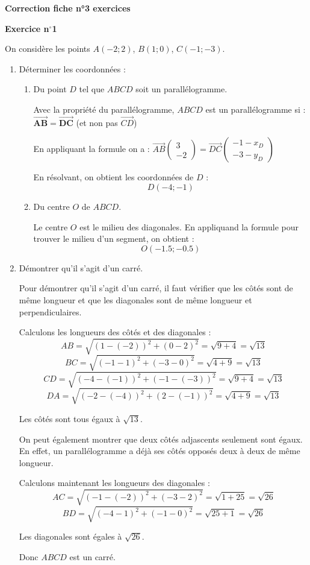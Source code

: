 \documentclass{article}
\newcommand*{\Coord}[2]{%
  \ensuremath{
    \begin{pmatrix}
      #1 \\[10pt]
      #2
    \end{pmatrix}}
}
\begin{document}
\begin{center}
    \Large{\textbf{Correction fiche n°3 exercices}}
\end{center}

\textbf{Exercice n$^\circ$1}

On considère les points $A(-2; 2)$, $B(1; 0)$, $C(-1; -3)$.

\begin{enumerate}
    \item Déterminer les coordonnées :

    \begin{enumerate}
        \item Du point $D$ tel que $ABCD$ soit un parallélogramme.

        Avec la propriété du parallélogramme, $ABCD$ est un parallélogramme si : 
        $\bm{\overrightarrow{AB} = \overrightarrow{DC}}$ (et non pas $\overrightarrow{CD}$)
        
        En appliquant la formule on a : $\overrightarrow{AB}\Coord{3}{-2} = 
        \overrightarrow{DC}\Coord{-1-x_D}{-3 - y_D}$

        En résolvant, on obtient les coordonnées de $D$ :
        \[
        D(-4; -1)
        \]

        \item Du centre $O$ de $ABCD$.

        Le centre $O$ est le milieu des diagonales. En appliquand la formule pour trouver le milieu d'un segment,
        on obtient : 
        \[
        O\left(-1.5; -0.5\right)
        \]

    \end{enumerate}

    \item Démontrer qu'il s'agit d'un carré.

    Pour démontrer qu'il s'agit d'un carré, il faut vérifier que les côtés sont de même longueur et que les diagonales sont de même longueur et perpendiculaires.

    Calculons les longueurs des côtés et des diagonales :
    \[
    AB = \sqrt{(1 - (-2))^2 + (0 - 2)^2} = \sqrt{9 + 4} = \sqrt{13}
    \]
    \[
    BC = \sqrt{(-1 - 1)^2 + (-3 - 0)^2} = \sqrt{4 + 9} = \sqrt{13}
    \]
    \[
    CD = \sqrt{(-4 - (-1))^2 + (-1 - (-3))^2} = \sqrt{9 + 4} = \sqrt{13}
    \]
    \[
    DA = \sqrt{(-2 - (-4))^2 + (2 - (-1))^2} = \sqrt{4 + 9} = \sqrt{13}
    \]

    Les côtés sont tous égaux à $\sqrt{13}$.

    On peut également montrer que deux côtés adjascents seulement sont égaux. En effet, un parallélogramme
    a déjà ses côtés opposés deux à deux de même longueur.

    Calculons maintenant les longueurs des diagonales :
    \[
    AC = \sqrt{(-1 - (-2))^2 + (-3 - 2)^2} = \sqrt{1 + 25} = \sqrt{26}
    \]
    \[
    BD = \sqrt{(-4 - 1)^2 + (-1 - 0)^2} = \sqrt{25 + 1} = \sqrt{26}
    \]

    Les diagonales sont égales à $\sqrt{26}$.

    Donc $ABCD$ est un carré.

\end{enumerate}
\end{document}
